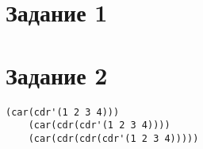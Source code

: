 \documentclass[a4paper,14pt, unknownkeysallowed]{extreport}
\begin{document}


\section*{Задание 1}


\section*{Задание 2}

\begin{lstlisting}[]
	(car(cdr'(1 2 3 4)))
	(car(cdr(cdr'(1 2 3 4))))
	(car(cdr(cdr(cdr'(1 2 3 4)))))
\end{lstlisting}
\end{document}
